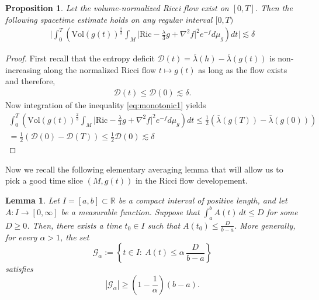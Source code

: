 \documentclass{amsart}
\newtheorem{proposition}{Proposition}[section]
\newtheorem{lemma}{Lemma}[section]
\begin{document}
\begin{proposition}
\label{integraldefect1}
 Let the volume-normalized Ricci flow exist on $[0,T]$. Then the following spacetime estimate holds on any regular interval $[0,T)$   
 \begin{eqnarray}
  \bigg|\int_{0}^{T}\left(\text{Vol}(g(t))^{\frac{2}{3}}\int_{M}\bigg|\text{Ric}-\frac{\lambda}{3}g+\nabla^{2}f\bigg|^{2}e^{-f}d\mu_{g}\right)dt\bigg|\lesssim \delta
 \end{eqnarray}
\end{proposition}

\begin{proof}
First recall that the entropy deficit $\mathcal{D}(t)=\overline{\lambda}(h)-\overline{\lambda}(g(t))$ is non-increasing along the normalized Ricci flow $t\mapsto g(t)$ as long as the flow exists and therefore, 
\begin{eqnarray}
\mathcal{D}(t)\leq \mathcal{D}(0)\lesssim \delta. 
\end{eqnarray}
Now integration of the inequality \ref{eq:monotonic1} yields
  \begin{eqnarray}
  \int_{0}^{T}\left(\text{Vol}(g(t))^{\frac{2}{3}}\int_{M}\bigg|\text{Ric}-\frac{\lambda}{3}g+\nabla^{2}f\bigg|^{2}e^{-f}d\mu_{g}\right)dt\leq \frac{1}{2}(\overline{\lambda}(g(T))-\overline{\lambda}(g(0)))\\\nonumber =\frac{1}{2}(\mathcal{D}(0)-\mathcal{D}(T))\leq \frac{1}{2}\mathcal{D}(0)\lesssim \delta
 \end{eqnarray}  
 
\end{proof}
\noindent Now we recall the following elementary averaging lemma that will allow us to pick a good time slice $(M,g(t))$ in the Ricci flow developement. 
\begin{lemma}
\label{lem:averaging-lemma}
Let \(I=[a,b]\subset \mathbb R\) be a compact interval of positive length, and let
$  A:I\longrightarrow [0,\infty]$
be a measurable function. Suppose that
$
        \int_a^b A(t)\,dt \leq D
$
for some \(D\geq 0\). Then, there exists a time \(t_0\in I\) such that
$A(t_0)
        \leq
        \frac{D}{b-a}$.
More generally, for every \(\alpha>1\), the set
\begin{equation}
\label{eq:good-time-set}
        \mathcal G_{\alpha}
        :=
        \left\{
        t\in I:\ 
        A(t)\leq
        \alpha\,\frac{D}{b-a}
        \right\}
\end{equation}
satisfies
\begin{equation}
\label{eq:good-time-set-measure}
        |\mathcal G_{\alpha}|
        \geq
        \left(1-\frac{1}{\alpha}\right)(b-a).
\end{equation}
\end{lemma}
\end{document}
